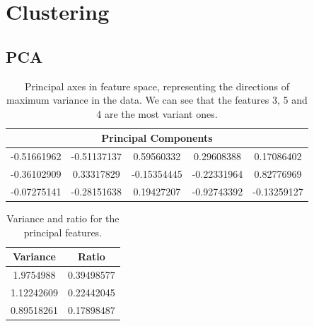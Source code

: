 %


\section{Clustering}

\subsection{PCA}

\begin{table}
	\begin{tabular}{ c c c c c }
		\hline
		\multicolumn{5}{c}{Principal Components} \\ \hline
		-0.51661962 & -0.51137137 &  0.59560332 &  0.29608388 &  0.17086402 \\ \hline
		-0.36102909 &  0.33317829 & -0.15354445 & -0.22331964 &  0.82776969 \\ \hline
		-0.07275141 & -0.28151638 &  0.19427207 & -0.92743392 & -0.13259127 \\ \hline
	\end{tabular}
	\caption{Principal axes in feature space, representing the directions of maximum variance in the data. We can see that the features 3, 5 and 4 are the most variant ones.}
	\label{tab:pca_components}
\end{table}

\begin{table}
	\begin{center}
		\begin{tabular}{cc}
			\hline
			Variance & Ratio \\ \hline
			1.9754988 & 0.39498577 \\
			1.12242609 & 0.22442045 \\
			0.89518261 & 0.17898487 \\
			\hline
		\end{tabular}
		\caption{Variance and ratio for the principal features.}
		\label{tab:pca_variance}
	\end{center}
\end{table}

